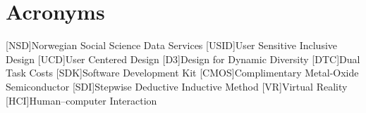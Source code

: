 \chapter*{Acronyms}
\begin{acronym}
[NSD]{Norwegian Social Science Data Services}
[USID]{User Sensitive Inclusive Design}
[UCD]{User Centered Design}
[D3]{Design for Dynamic Diversity}
[DTC]{Dual Task Costs}
[SDK]{Software Development Kit}
[CMOS]{Complimentary Metal-Oxide Semiconductor}
[SDI]{Stepwise Deductive Inductive Method}
[VR]{Virtual Reality}
[HCI]{Human–computer Interaction}

\end{acronym}